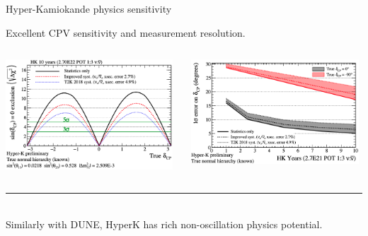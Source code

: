 \begin{frame}{Hyper-Kamiokande physics sensitivity}

Excellent CPV sensitivity and measurement resolution.\\
\vspace{0.2cm}
\begin{columns}[t]
    \begin{column}{0.50\textwidth}
      \includegraphics[width=0.98\textwidth]{./images/3nu/accelerator/hyperk_new_cpv_2021_a}\\
    \end{column}
    \begin{column}{0.50\textwidth}
      \includegraphics[width=0.98\textwidth]{./images/3nu/accelerator/hyperk_new_cpv_2021_b}\\
    \end{column}
\end{columns}

\noindent\rule{2cm}{0.4pt}\\
{\scriptsize
Similarly with DUNE, HyperK has rich non-oscillation physics potential.
}

\end{frame}

%
%
%

%
%

